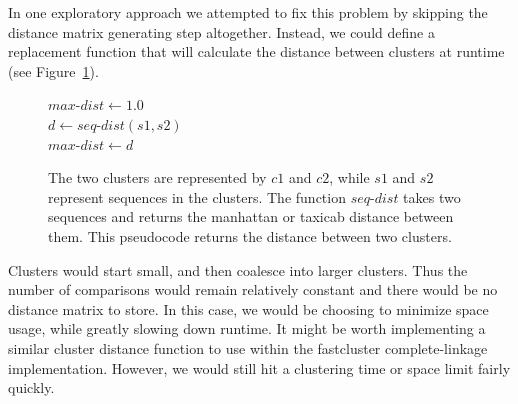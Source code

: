 In one exploratory approach we attempted to fix this problem by skipping the distance matrix generating step altogether.
Instead, we could define a replacement function that will calculate the distance between clusters at runtime (see Figure~\ref{code:LazyClustering}).



\begin{figure}[h!]
\begin{algorithm}[H]
 \SetAlgoLined

\BlankLine
 $max$-$dist \gets 1.0$\\
  {
    {
    $d \gets seq$-$dist(s1, s2)$\\
     {
      $max$-$dist \gets d$
    }
   }
 }
\end{algorithm}
\caption[Pseudocode showing a distance function for two clusters.]{The two clusters are represented by $c1$ and $c2$, while $s1$ and $s2$ represent sequences in the clusters. The function $seq$-$dist$ takes two sequences and returns the manhattan or taxicab distance between them. This pseudocode returns the distance between two clusters.}
\label{code:LazyClustering}
\end{figure}

Clusters would start small, and then coalesce into larger clusters.
Thus the number of comparisons would remain relatively constant and there would be no distance matrix to store.
In this case, we would be choosing to minimize space usage, while greatly slowing down runtime.
It might be worth implementing a similar cluster distance function to use within the fastcluster complete-linkage implementation.
However, we would still hit a clustering time or space limit fairly quickly.

